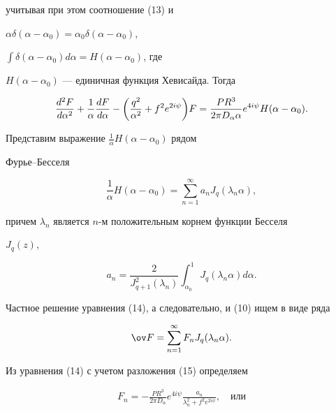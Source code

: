 \begin{pf}
учитывая при этом соотношение (13) и 


$\alpha\delta(\alpha-\alpha_0)=\alpha_0\delta(\alpha-\alpha_0)$, 


$\int\delta(\alpha-\alpha_0)d\alpha=H(\alpha-\alpha_0)$, где 


$H(\alpha-\alpha_0)$ --- единичная функция Хевисайда. Тогда 


\begin{equation} 


\myfrac{^2F}{^2}+\frac{1}{\alpha}\myfrac{F}{}- 


\bigg(\frac{q^2}{\alpha^2}+f^2e^{2i\psi}\bigg)F= 


\frac{P R^3}{2\pi D_\alpha\alpha}e^{4i\psi} 


H(\alpha-\alpha_0). 


\end{equation} 


Представим выражение $\frac{1}{\alpha}H(\alpha-\alpha_0)$ рядом 


Фурье--Бесселя \cite{3} 


\begin{equation} 


\frac{1}{\alpha}H(\alpha-\alpha_0)=\sum^\infty_{n=1} 


a_n J_q(\lambda_n\alpha), 


\end{equation} 


причем $\lambda_n$ является $n$-м положительным корнем функции Бесселя 


$J_q(z)$, 


$$ 


a_n=\frac{2}{J^2_{q+1}(\lambda_n)}\int^1_{\alpha_0} 


J_q(\lambda_n\alpha)d\alpha. 


$$ 


Частное решение уравнения (14), а следовательно, и (10) ищем в виде ряда 


$$ 


\ov F=\sum^\infty_{n=1}F_n J_q(\lambda_n\alpha). 


$$ 


Из уравнения (14) с учетом разложения (15) определяем 


\begin{gather*} 


F_n=-\frac{P R^3}{2\pi D_\alpha}e^{4i\psi} 


\frac{a_n}{\lambda^2_n+f^2e^{2i\psi}},\quad 


\text{или} 



\end{gather*}
\end{pf}
